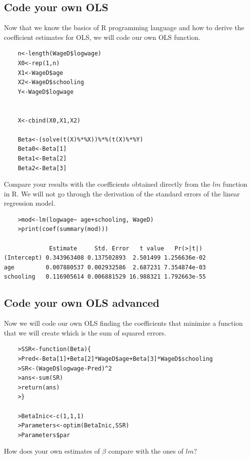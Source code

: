 \documentclass[11pt,letterpaper]{article}
\begin{document}
\subsection{Code your own OLS}
Now that we know the basics of R programming language and how to derive the coefficient estimates for OLS, we will code our own OLS function. 

\begin{verbatim}
    n<-length(WageD$logwage)
    X0<-rep(1,n)
    X1<-WageD$age
    X2<-WageD$schooling
    Y<-WageD$logwage


    X<-cbind(X0,X1,X2)

    Beta<-(solve(t(X)%*%X))%*%(t(X)%*%Y)
    Beta0<-Beta[1]
    Beta1<-Beta[2]
    Beta2<-Beta[3]
\end{verbatim}

Compare your results with the coefficients obtained directly from the $lm$ function in R. We will not go through the derivation of the standard errors of the linear regression model. 
\begin{verbatim}
    >mod<-lm(logwage~ age+schooling, WageD)
    >print(coef(summary(mod)))
    
             Estimate     Std. Error   t value   Pr(>|t|)
(Intercept) 0.343963408 0.137502893  2.501499 1.256636e-02
age         0.007880537 0.002932586  2.687231 7.354874e-03
schooling   0.116905614 0.006881529 16.988321 1.792663e-55

\end{verbatim}

\subsection{Code your own OLS advanced}
Now we will code our own OLS finding the coefficients that minimize a function that we will create which is the sum of squared errors.

\begin{verbatim}
    >SSR<-function(Beta){
    >Pred<-Beta[1]+Beta[2]*WageD$age+Beta[3]*WageD$schooling
    >SR<-(WageD$logwage-Pred)^2
    >ans<-sum(SR)
    >return(ans)
    >}

    >BetaInic<-c(1,1,1)
    >Parameters<-optim(BetaInic,SSR)
    >Parameters$par

\end{verbatim}
How does your own estimates of $\beta$ compare with the ones of $lm$?
\end{document}
